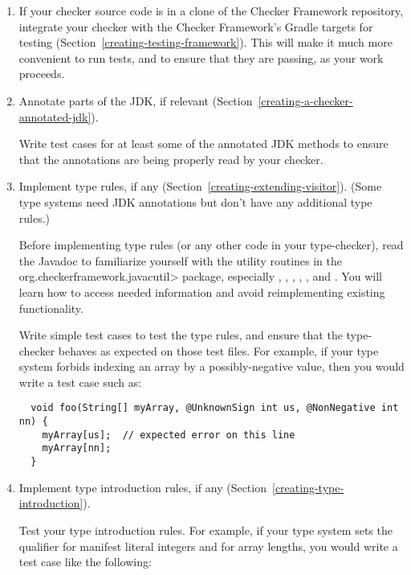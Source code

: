 \begin{enumerate}
\item
  If your checker source code is in a clone of the Checker Framework
  repository, integrate your checker with the Checker Framework's Gradle
  targets for testing (Section~\ref{creating-testing-framework}).  This
  will make it much more convenient to run tests, and to ensure that they
  are passing, as your work proceeds.

\item
  Annotate parts of the JDK, if relevant
  (Section~\ref{creating-a-checker-annotated-jdk}).

  Write test cases for at least some of the annotated JDK methods to ensure
  that the annotations are being properly read by your checker.

\item
  Implement type rules, if any (Section~\ref{creating-extending-visitor}).
  (Some type systems need JDK annotations but don't have any additional
  type rules.)

  Before implementing type rules (or any other code in your type-checker),
  read the Javadoc to familiarize yourself with the utility routines in the
  \<org.checkerframework.javacutil> package, especially
  ,
  ,
  ,
  ,
  , and
  .
  You will learn how to access needed information and avoid
  reimplementing existing functionality.

  Write simple test cases to test the type rules, and ensure that the
  type-checker behaves as expected on those test files.
  For example, if your type system forbids indexing an array by a
  possibly-negative value, then you would write a test case such as:

\begin{Verbatim}
  void foo(String[] myArray, @UnknownSign int us, @NonNegative int nn) {
    myArray[us];  // expected error on this line
    myArray[nn];
  }
\end{Verbatim}

\item
  Implement type introduction rules, if any (Section~\ref{creating-type-introduction}).

  Test your type introduction rules.
  For example, if your type system sets the qualifier for manifest literal
  integers and for array lengths, you would write a test case like the following:


\end{enumerate}
